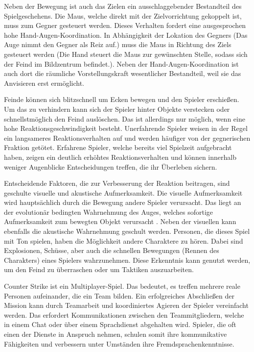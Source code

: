 Neben der Bewegung ist auch das Zielen ein ausschlaggebender Bestandteil des Spielgeschehens. Die Maus, welche direkt mit der Zielvorrichtung gekoppelt ist, muss zum Gegner gesteuert werden. Dieses Verhalten fordert eine ausgesprochen hohe Hand-Augen-Koordination. In Abhängigkeit der Lokation des Gegners (Das Auge nimmt den Gegner als Reiz auf.) muss die Maus in Richtung des Ziels gesteuert werden (Die Hand steuert die Maus zur gewünschten Stelle, sodass sich der Feind im Bildzentrum befindet.). Neben der Hand-Augen-Koordination ist auch dort die räumliche Vorstellungskraft wesentlicher Bestandteil, weil sie das Anvisieren erst ermöglicht. 

Feinde können sich blitzschnell um Ecken bewegen und den Spieler erschießen. Um das zu verhindern kann sich der Spieler hinter Objekte verstecken oder schnellstmöglich den Feind auslöschen. Das ist allerdings nur möglich, wenn eine hohe Reaktionsgeschwindigkeit besteht. Unerfahrende Spieler weisen in der Regel ein langsameres Reaktionsverhalten auf und werden häufiger von der gegnerischen Fraktion getötet. Erfahrene Spieler, welche bereits viel Spielzeit aufgebracht haben, zeigen ein deutlich erhöhtes Reaktionsverhalten und können innerhalb weniger Augenblicke Entscheidungen treffen, die ihr Überleben sichern.

Entscheidende Faktoren, die zur Verbesserung der Reaktion beitragen, sind geschulte visuelle und akustische Aufmerksamkeit. Die visuelle Aufmerksamkeit wird hauptsächlich durch die Bewegung andere Spieler verursacht. Das liegt an der evolutionär bedingten Wahrnehmung des Auges, welches sofortige Aufmerksamkeit zum bewegten Objekt verursacht \cite{juliagross2011}. Neben der visuellen kann ebenfalls die akustische Wahrnehmung geschult werden. Personen, die dieses Spiel mit Ton spielen, haben die Möglichkeit andere Charaktere zu hören. Dabei sind Explosionen, Schüsse, aber auch die schnellen Bewegungen (Rennen des Charakters) eines Spielers wahrzunehmen. Diese Erkenntnis kann genutzt werden, um den Feind zu überraschen oder um Taktiken auszuarbeiten.

Counter Strike ist ein Multiplayer-Spiel. Das bedeutet, es treffen mehrere reale Personen aufeinander, die ein Team bilden. Ein erfolgreiches Abschließen der Mission kann durch Teamarbeit und koordiniertes Agieren der Spieler vereinfacht werden. Das erfordert Kommunikationen zwischen den Teammitgliedern, welche in einem Chat oder über einem Sprachdienst abgehalten wird. Spieler, die oft einen der Dienste in Anspruch nehmen, schulen somit ihre kommunikative Fähigkeiten und verbessern unter Umständen ihre Fremdsprachenkenntnisse.

